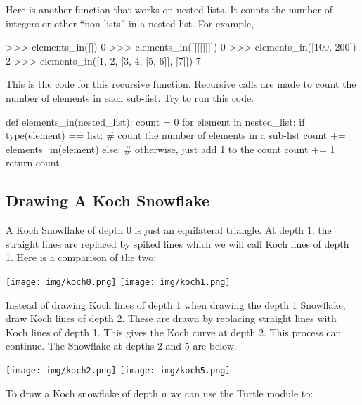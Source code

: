 \documentclass[11pt]{cselabheader}
\begin{document}
Here is another function that works on nested lists.
It counts the number of integers or other ``non-lists'' in a nested list.
For example,

\begin{pyconcode}
>>> elements_in([])
0
>>> elements_in([[[[]]]])
0
>>> elements_in([100, 200])
2
>>> elements_in([1, 2, [3, 4, [5, 6]], [7]])
7
\end{pyconcode}

This is the code for this recursive function. Recursive calls are made to count
the number of elements in each sub-list. Try to run this code.

\begin{python3code}
def elements_in(nested_list):
    count = 0
    for element in nested_list:
        if type(element) == list:
            # count the number of elements in a sub-list
            count += elements_in(element)
        else:
            # otherwise, just add 1 to the count
            count += 1
    return count
\end{python3code}

\subsection{Drawing A Koch Snowflake}

A Koch Snowflake of depth 0 is just an equilateral triangle.  At depth
1, the straight lines are replaced by spiked lines which we will call
Koch lines of depth 1.  Here is a comparison of the two:

\begin{center}
\texttt{[image: img/koch0.png]}
\texttt{[image: img/koch1.png]}
\end{center}

Instead of drawing Koch lines of depth 1 when drawing the depth 1
Snowflake, draw Koch lines of depth 2. These are drawn by replacing
straight lines with Koch lines of depth 1. This gives the Koch curve
at depth 2.  This process can continue. The Snowflake at depths 2 and
5 are below.

\begin{center}
\texttt{[image: img/koch2.png]}
\texttt{[image: img/koch5.png]}
\end{center}

To draw a Koch snowflake of depth $n$ we can use the Turtle module to:
\end{document}
